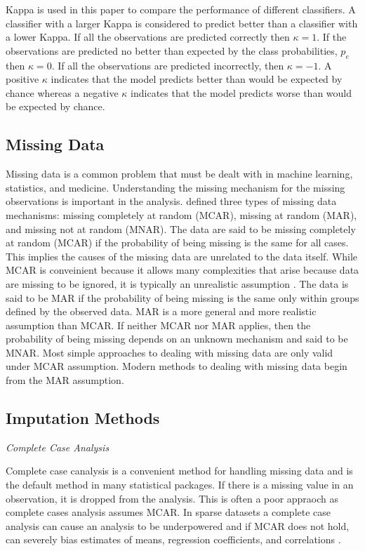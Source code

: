 \documentclass[12pt,]{article}
\begin{document}
Kappa is used in this paper to compare the performance of different
classifiers. A classifier with a larger Kappa is considered to predict
better than a classifier with a lower Kappa. If all the observations are
predicted correctly then \(\kappa=1\). If the observations are predicted
no better than expected by the class probabilities, \(p_e\) then
\(\kappa=0\). If all the observations are predicted incorrectly, then
\(\kappa=-1\). A positive \(\kappa\) indicates that the model predicts
better than would be expected by chance whereas a negative \(\kappa\)
indicates that the model predicts worse than would be expected by
chance.

\subsection{Missing Data}\label{missing-data}

Missing data is a common problem that must be dealt with in machine
learning, statistics, and medicine. Understanding the missing mechanism
for the missing observations is important in the analysis.
\autocite{rubin_inference_1976} defined three types of missing data
mechanisms: missing completely at random (MCAR), missing at random
(MAR), and missing not at random (MNAR). The data are said to be missing
completely at random (MCAR) if the probability of being missing is the
same for all cases. This implies the causes of the missing data are
unrelated to the data itself. While MCAR is conveinient because it
allows many complexities that arise because data are missing to be
ignored, it is typically an unrealistic assumption
\autocite{van_buuren_flexible_2012}. The data is said to be MAR if the
probability of being missing is the same only within groups defined by
the observed data. MAR is a more general and more realistic assumption
than MCAR. If neither MCAR nor MAR applies, then the probability of
being missing depends on an unknown mechanism and said to be MNAR. Most
simple approaches to dealing with missing data are only valid under MCAR
assumption. Modern methods to dealing with missing data begin from the
MAR assumption.

\subsection{Imputation Methods}\label{imputation-methods}

\emph{Complete Case Analysis}

Complete case canalysis is a convenient method for handling missing data
and is the default method in many statistical packages. If there is a
missing value in an observation, it is dropped from the analysis. This
is often a poor appraoch as complete cases analysis assumes MCAR. In
sparse datasets a complete case analysis can cause an analysis to be
underpowered and if MCAR does not hold, can severely bias estimates of
means, regression coefficients, and correlations
\autocite{van_buuren_flexible_2012}.
\end{document}
